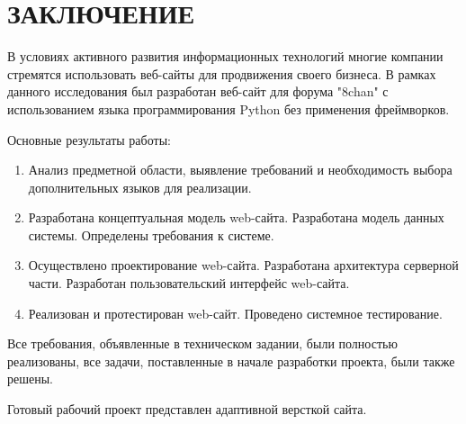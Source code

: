 \section*{ЗАКЛЮЧЕНИЕ}

В условиях активного развития информационных технологий многие компании стремятся использовать веб-сайты для продвижения своего бизнеса. В рамках данного исследования был разработан веб-сайт для форума "8chan" с использованием языка программирования Python без применения фреймворков.

Основные результаты работы:

\begin{enumerate}
\item Анализ предметной области, выявление требований и необходимость выбора дополнительных языков для реализации.
\item Разработана концептуальная модель web-сайта. Разработана модель данных системы. Определены требования к системе.
\item Осуществлено проектирование web-сайта. Разработана архитектура серверной части. Разработан пользовательский интерфейс web-сайта.
\item Реализован и протестирован web-сайт. Проведено системное тестирование.
\end{enumerate}

Все требования, объявленные в техническом задании, были полностью реализованы, все задачи, поставленные в начале разработки проекта, были также решены.

Готовый рабочий проект представлен адаптивной версткой сайта.

